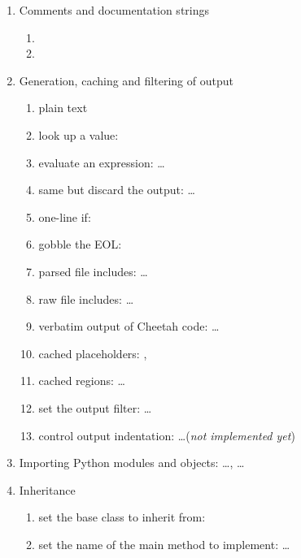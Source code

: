 \begin{enumerate}
\item Comments and documentation strings
     \begin{enumerate}
     \item {}
     \item {}
     \end{enumerate}

\item Generation, caching and filtering of output
     \begin{enumerate}
     \item plain text
     \item look up a value: 
     \item evaluate an expression:  \ldots
     \item same but discard the output:  \ldots
     \item one-line if: 
     \item gobble the EOL: 
     \item parsed file includes:  \ldots
     \item raw file includes:  \ldots
     \item verbatim output of Cheetah code:  \ldots {}
     \item cached placeholders: , 
     \item cached regions:  \ldots {}
     \item set the output filter:  \ldots
     \item control output indentation:  \ldots ({\em not
implemented yet})
     \end{enumerate}
          
\item Importing Python modules and objects:  \ldots,
      \ldots

\item Inheritance 
     \begin{enumerate}
     \item set the base class to inherit from: 
     \item set the name of the main method to implement: 
\ldots
     \end{enumerate}


\end{enumerate}

